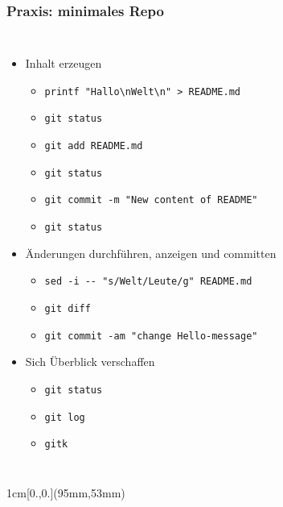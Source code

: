 \documentclass{beamer}
\begin{document}
\begin{frame}[fragile,label=gitintro40]
\frametitle{Praxis: minimales Repo}
\vspace{-5mm}
\begin{columns}
\begin{itemize}
 \item Inhalt erzeugen
\begin{itemize}
 \item \verb|printf "Hallo\nWelt\n" > README.md|
 \item \verb|git status|
 \item \verb|git add README.md| \qquad {}
 \item \verb|git status|
 \item \verb|git commit -m "New content of README"| %
 \item \verb|git status|
\end{itemize}
\pause
 \item Änderungen durchführen, anzeigen und committen
\begin{itemize}
 \item \verb|sed -i -- "s/Welt/Leute/g" README.md|
 \item \verb|git diff|
 \pause
 \pause
 \item \verb|git commit -am "change Hello-message"|
\end{itemize}
 \pause
 \item Sich Überblick verschaffen
 \begin{itemize}
 \item \verb|git status|
 \item \verb|git log|
 \item \verb|gitk|
 \end{itemize}
\end{itemize}

~
\end{columns}


\begin{textblock*}{1cm}[0.,0.](95mm,53mm)
\end{textblock*}

\end{frame}
\end{document}
